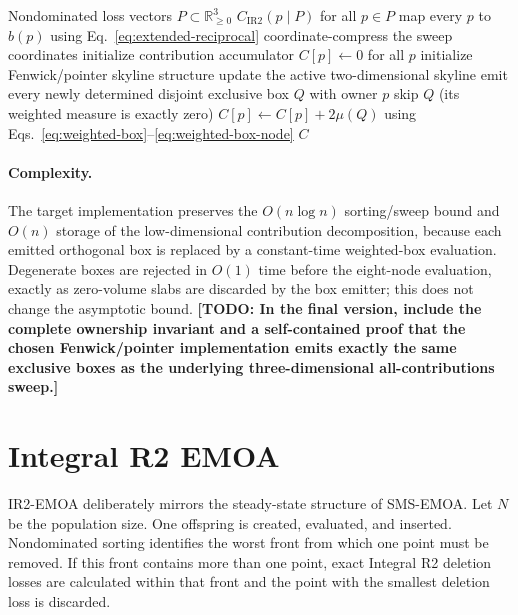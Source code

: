 \documentclass[runningheads]{llncs}
\newcommand{\IR}{\operatorname{IR2}}
\newcommand{\todo}[1]{\textcolor{red!70!black}{\textbf{[TODO: #1]}}}
\newcommand{\R}{\mathbb{R}}
\newcommand{\cIR}{C_{\IR}}
\begin{document}
\begin{algorithm}[t]
\caption{Three-objective all-deletion-loss framework}
\label{alg:all3d}
\begin{algorithmic}[1]
\Require Nondominated loss vectors $P\subset\R^3_{\ge0}$
\Ensure $\cIR(p\mid P)$ for all $p\in P$
\State map every $p$ to $b(p)$ using Eq.~\eqref{eq:extended-reciprocal}
\State coordinate-compress the sweep coordinates
\State initialize contribution accumulator $C[p]\gets0$ for all $p$
\State initialize Fenwick/pointer skyline structure
    \State update the active two-dimensional skyline
    \State emit every newly determined disjoint exclusive box $Q$ with owner $p$
        \State skip $Q$ (its weighted measure is exactly zero)
    \Else
        \State $C[p]\gets C[p]+2\mu(Q)$ using Eqs.~\eqref{eq:weighted-box}--\eqref{eq:weighted-box-node}
    \EndIf
\EndFor
\State \Return $C$
\end{algorithmic}
\end{algorithm}

\paragraph{Complexity.}
The target implementation preserves the $O(n\log n)$ sorting/sweep bound and $O(n)$ storage of the low-dimensional contribution decomposition, because each emitted orthogonal box is replaced by a constant-time weighted-box evaluation. Degenerate boxes are rejected in $O(1)$ time before the eight-node evaluation, exactly as zero-volume slabs are discarded by the box emitter; this does not change the asymptotic bound. \todo{In the final version, include the complete ownership invariant and a self-contained proof that the chosen Fenwick/pointer implementation emits exactly the same exclusive boxes as the underlying three-dimensional all-contributions sweep.}

\section{Integral R2 EMOA}
\label{sec:emoa}

IR2-EMOA deliberately mirrors the steady-state structure of SMS-EMOA. Let $N$ be the population size. One offspring is created, evaluated, and inserted. Nondominated sorting identifies the worst front from which one point must be removed. If this front contains more than one point, exact Integral R2 deletion losses are calculated within that front and the point with the smallest deletion loss is discarded.
\end{document}
